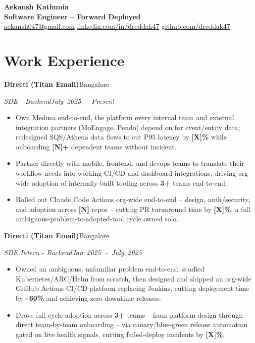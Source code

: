 \documentclass[10pt,letterpaper]{article}
\newcommand{\resumeHeading}[4]{%
  \par\noindent\textbf{#1}\hfill\mbox{#2}\par
  \noindent\textit{#3}\hfill\mbox{\textit{#4}}\par
}
\begin{document}
\begin{center}
  {\LARGE\bfseries Aekansh Kathunia}\\[-1pt]
  \textbf{Software Engineer -- Forward Deployed}\\[1pt]

  \href{mailto:aekansh047@gmail.com}{aekansh047@gmail.com}
  \enspace\textbar\enspace \href{https://www.linkedin.com/in/dreddak47}{linkedin.com/in/dreddak47}
  \enspace\textbar\enspace
  \href{https://github.com/dreddak47}{github.com/dreddak47}
\end{center}
\vspace{-10pt}

\section{Work Experience}
\resumeHeading{Directi (Titan Email)}{Bangalore}{SDE - Backend}{July 2025 -- Present}
\begin{itemize}
\item Own Medusa end-to-end, the platform every internal team and external integration partners (MoEngage, Pendo) depend on for event/entity data; redesigned SQS/Athena data flows to cut P95 latency by \textbf{[X]\%} while onboarding \textbf{[N]+} dependent teams without incident. %
\item Partner directly with mobile, frontend, and devops teams to translate their workflow needs into working CI/CD and dashboard integrations, driving org-wide adoption of internally-built tooling across \textbf{3+} teams end-to-end.
\item Rolled out Claude Code Actions org-wide end-to-end -- design, auth/security, and adoption across \textbf{[N]} repos -- cutting PR turnaround time by \textbf{[X]\%}, a full ambiguous-problem-to-adopted-tool cycle owned solo. %
\end{itemize}

\resumeHeading{Directi (Titan Email)}{Bangalore}{SDE Intern - Backend}{Jan 2025 -- July 2025}
\begin{itemize}
\item Owned an ambiguous, unfamiliar problem end-to-end: studied Kubernetes/ARC/Helm from scratch, then designed and shipped an org-wide GitHub Actions CI/CD platform replacing Jenkins, cutting deployment time by \textbf{\textasciitilde 60\%} and achieving zero-downtime releases.
\item Drove full-cycle adoption across \textbf{3+} teams -- from platform design through direct team-by-team onboarding -- via canary/blue-green release automation gated on live health signals, cutting failed-deploy incidents by \textbf{[X]\%}. %
\end{itemize}
\end{document}
